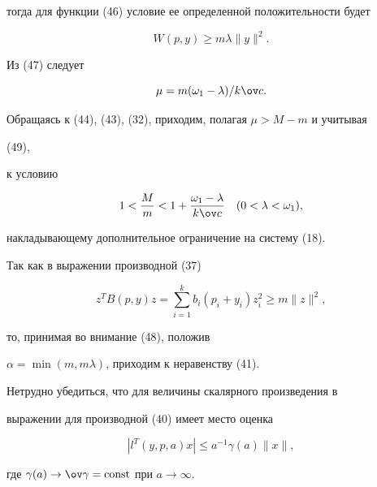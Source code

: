 тогда для функции (46) условие ее определенной положительности будет 


\begin{equation} 


W(p,y)\ge m\lambda\|y\|^2. 


\end{equation} 


Из (47) следует 


\begin{equation} 


\mu=m(\omega_1-\lambda)/k\ov c. 


\end{equation} 


 


Обращаясь к (44), (43), (32), приходим, полагая $\mu>M-m$ и учитывая 


(49),  


к условию 


\begin{equation} 


1<\frac{M}{m}<1+\frac{\omega_1-\lambda}{k\ov c}\quad 


(0<\lambda<\omega_1), 


\end{equation} 


накладывающему дополнительное ограничение на систему (18). 


 


Так как в выражении производной (37) 


$$ 


z^T B(p,y)z=\sum^k_{i=1}b_i(p_i+y_i)z^2_i\ge m\|z\|^2, 


$$  


то, принимая во внимание (48), положив 


$\alpha=\min(m,m\lambda)$, приходим к неравенству (41). 


 


Нетрудно убедиться, что для величины скалярного произведения в 


выражении для производной (40) имеет место оценка 


\begin{equation} 


|l^T(y,p,a)x|\le a^{-1}\gamma(a)\|x\|, 


\end{equation} 


где $\gamma(a)\to\ov\gamma=\const$ при $a\to\infty$. 



